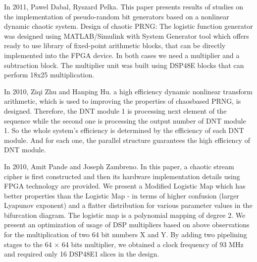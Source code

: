 In 2011, Pawel Dabal, Ryszard Pelka. This paper presents results of studies on the implementation of pseudo-random bit generators based on a nonlinear dynamic chaotic system. Design of chaotic PRNG: The logistic function generator was designed using MATLAB/Simulink with System Generator tool which offers ready to use library of fixed-point arithmetic blocks, that can be directly implemented into the FPGA device. In both cases we need a multiplier and a subtraction block. The multiplier unit was built using DSP48E blocks that can perform 18x25 multiplication.

In 2010, Ziqi Zhu and Hanping Hu. a high efficiency dynamic nonlinear transform arithmetic, which is used to improving the properties of chaosbased PRNG, is designed. Therefore, the DNT module 1 is processing next element of the sequence while the second one is processing the output number of DNT module 1. So the whole system's efficiency is determined by the efficiency of each DNT module. And for each one, the parallel structure guarantees the high efficiency of DNT module.

In 2010, Amit Pande and Joseph Zambreno. In this paper, a chaotic stream cipher is first constructed and then its hardware implementation details using FPGA technology are provided. We present a Modified Logistic Map which has better properties than the Logistic Map - in terms of higher confusion (larger Lyapunov exponent) and a flatter distribution for various parameter values in the bifurcation diagram. The logistic map is a polynomial mapping of degree 2. We present an optimization of usage of DSP multipliers based on above observations for the multiplication of two 64 bit numbers X and Y. By adding two pipelining stages to the 64 $\times$ 64 bits multiplier, we obtained a clock frequency of 93 MHz and required only 16 DSP48E1 slices in the design.

